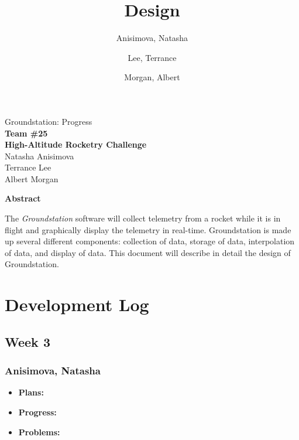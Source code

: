 \documentclass[10pt,draftclsnofoot,onecolumn]{IEEEtran}
\begin{document}
	\singlespace
	
	\title{\vspace{2in}Design}
	
	\author {
		Anisimova, Natasha
		\and
		Lee, Terrance
		\and
		Morgan, Albert
	}
	
	
	\pagestyle{empty}
	\vspace*{2in}
	\begin{center}
		\huge
		Groundstation: Progress\\
		\normalsize
		\vspace{5mm}
		\textbf{
			Team \#25\\
			High-Altitude Rocketry Challenge\\
		}
		\vspace{1mm}
		Natasha Anisimova\\
		Terrance Lee\\
		Albert Morgan
	\end{center}
	
	\vspace{5mm}
	
	\begin{center}
		\textbf{Abstract}
	\end{center}
	
	
	The \textit{Groundstation} software will collect telemetry from a rocket while it is in flight and graphically display the telemetry in real-time. Groundstation is made up several different components: collection of data, storage of data, interpolation of data, and 
	display of data.
	This document will describe in detail the design of Groundstation.
		
	\pagestyle{headings}
	
	\newpage

	\tableofcontents
	\newpage

\section{Development Log}


\subsection{Week 3}
\subsubsection{Anisimova, Natasha}
\begin{itemize}
	\item \textbf{Plans:}
	\item \textbf{Progress:}
	\item \textbf{Problems:}
\end{itemize}
\end{document}
